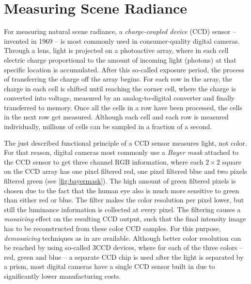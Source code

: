 \section{Measuring Scene Radiance}
\label{sec:radiancetoirradiance}
For measuring natural scene radiance, a \emph{charge-coupled device} (CCD) sensor -- invented in 1969 -- is most commonly used in consumer-quality digital cameras. Through a lens, light is projected on a photoactive array, where in each cell electric charge proportional to the amount of incoming light (photons) at that specific location is accumulated. After this so-called exposure period, the process of transferring the charge off the array begins. For each row in the array, the charge in each cell is shifted until reaching the corner cell, where the charge is converted into voltage, measured by an analog-to-digital converter and finally transferred to memory. Once all the cells in a row have been processed, the cells in the next row get measured. Although each cell and each row is measured individually, millions of cells can be sampled in a fraction of a second.

The just described functional principle of a CCD sensor measures light, not color. For that reason, digital cameras most commonly use a \emph{Bayer mask} attached to the CCD sensor to get three channel RGB information, where each $2 \times 2$ square on the CCD array has one pixel filtered red, one pixel filtered blue and two pixels filtered green (see \autoref{fig:bayermask}). The high amount of green filtered pixels is chosen due to the fact that the human eye also is much more sensitive to green than either red or blue. The filter makes the color resolution per pixel lower, but still the luminance information is collected at every pixel. The filtering causes a \emph{mosaicing} effect on the resulting CCD output, such that the final intensity image has to be reconstructed from these color CCD samples. For this purpose, \emph{demosaicing} techniques as in \cite{kimmel1998demosaicing} are available. Although better color resolution can be reached by using so-called 3CCD devices, where for each of the three colors -- red, green and blue -- a separate CCD chip is used after the light is separated by a prism, most digital cameras have a single CCD sensor built in due to significantly lower manufacturing costs.

